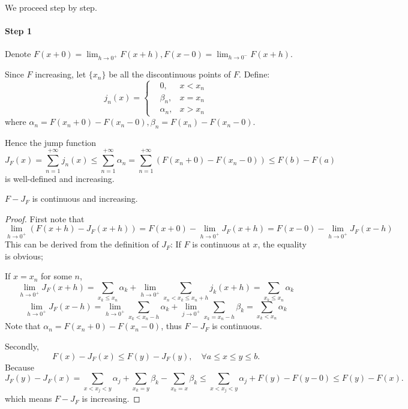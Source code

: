 	\vspace{1em}
	We proceed step by step.

	\paragraph{Step 1}
	Denote $F(x+0)=\lim_{h\to 0^+}F(x+h), F(x-0)=\lim_{h\to 0^-}F(x+h)$.

	Since $F$ increasing, let $\{x_n\}$ be all the discontinuous points of $F$.
	Define:
	\[
	j_n(x) = \left\{\begin{aligned}
		&0, &x<x_n\\ &\beta_n, &x=x_n\\ &\alpha_n, & x>x_n
	\end{aligned}\right.
	\]
	where $\alpha_n = F(x_n+0)-F(x_n-0), \beta_n = F(x_n) - F(x_n-0)$.

	Hence the jump function 
	\[
	J_F(x) = \sum_{n=1}^{+\infty} j_n(x)\le \sum_{n=1}^{+\infty} \alpha_n
	= \sum_{n=1}^{+\infty} (F(x_n+0)-F(x_n-0)) \le F(b)-F(a)
	\]
	is well-defined and increasing.

\begin{theorem}
    $F-J_F$ is continuous and increasing.
\end{theorem}
\begin{proof}[Proof]
    First note that
	\[
	\lim_{h\to 0^+} (F(x+h)-J_F(x+h)) = F(x+0)-\lim_{h\to 0^+} J_F(x+h)
	= F(x-0) - \lim_{h\to 0^+} J_F(x-h)
	\]
	This can be derived from the definition of $J_F$:
	If $F$ is continuous at $x$, the equality is obvious;

	If $x = x_n$ for some $n$,
	\[
	\lim_{h\to 0^+} J_F(x+h) = \sum_{x_k\le x_n} \alpha_k
	+ \lim_{h\to 0^+}\sum_{x_n<x_k\le x_n+h} j_k(x+h)
	= \sum_{x_k\le x_n}\alpha_k
	\]
	\[
	\lim_{h\to 0^+}J_F(x-h) =
	\lim_{h\to 0^+} \sum_{x_k<x_n-h} \alpha_k + \lim_{j\to 0^+}\sum_{x_k=x_n-h} \beta_k
	= \sum_{x_k<x_n} \alpha_k
	\]
	Note that $\alpha_n = F(x_n + 0) - F(x_n - 0)$,
	thus $F-J_F$ is continuous.

	Secondly,
	\[
	F(x)-J_F(x)\le F(y)-J_F(y), \quad\forall a\le x\le y\le b.
	\]
	Because
	\[
	J_F(y)-J_F(x) = \sum_{x<x_j<y}\alpha_j + \sum_{x_k=y}\beta_k - \sum_{x_k=x}\beta_k
	\le \sum_{x<x_j<y}\alpha_j + F(y)-F(y-0) \le F(y) - F(x).
	\]
	which means $F-J_F$ is increasing.
\end{proof}
